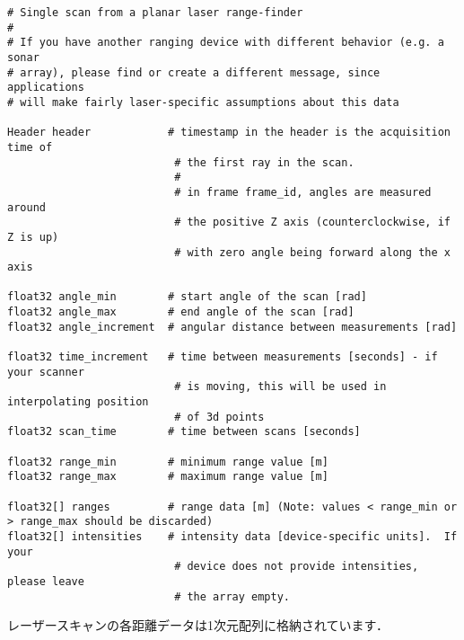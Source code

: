 \documentclass[{../../master}]{subfiles}
\begin{document}
\begin{lstlisting}[label=code:laserscan_definition, caption=Message Definition of \textsf{sensor\_msgs/LaserScan}]
# Single scan from a planar laser range-finder
#
# If you have another ranging device with different behavior (e.g. a sonar
# array), please find or create a different message, since applications
# will make fairly laser-specific assumptions about this data

Header header            # timestamp in the header is the acquisition time of 
                          # the first ray in the scan.
                          #
                          # in frame frame_id, angles are measured around 
                          # the positive Z axis (counterclockwise, if Z is up)
                          # with zero angle being forward along the x axis
                          
float32 angle_min        # start angle of the scan [rad]
float32 angle_max        # end angle of the scan [rad]
float32 angle_increment  # angular distance between measurements [rad]

float32 time_increment   # time between measurements [seconds] - if your scanner
                          # is moving, this will be used in interpolating position
                          # of 3d points
float32 scan_time        # time between scans [seconds]

float32 range_min        # minimum range value [m]
float32 range_max        # maximum range value [m]

float32[] ranges         # range data [m] (Note: values < range_min or > range_max should be discarded)
float32[] intensities    # intensity data [device-specific units].  If your
                          # device does not provide intensities, please leave
                          # the array empty.
\end{lstlisting}

レーザースキャンの各距離データは1次元配列に格納されています．
\end{document}
